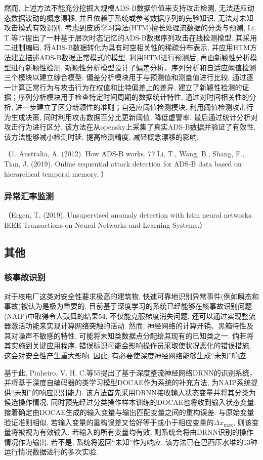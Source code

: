 \documentclass{Style/aas}
\begin{document}
\begin{multicols}{2}
  然而, 上述方法不能充分挖掘大规模ADS-B数据价值来支持攻击检测, 无法适应动态数据波动的概念漂移, 并且依赖于系统或参考数据序列的先验知识, 无法对未知攻击模式有效识别. 考虑到皮质学习算法(HTM)擅长处理流数据的分类与预测, Li, T.等77提出了一种基于层次时态记忆的ADS-B数据序列攻击在线检测模型. 其采用二进制编码, 将ADS-B数据转化为具有时空相关性的稀疏分布表示, 并应用HTM方法建立描述ADS-B数据正常模式的模型. 利用HTM进行预测后, 再由新颖性分析模型进行新颖性检测, 新颖性分析模型设计了偏差分析、序列分析和自适应阈值检测三个模块以建立综合模型: 偏差分析模块用于与预测值和测量值进行比较, 通过逐一计算正常行为与攻击行为在权值和比特偏差上的差异, 建立了新颖性检测的证据；序列分析模块用于检查特定时间周期的数据统计特性, 通过对时间相关性的分析, 进一步建立了区分新颖性的准则；自适应阈值检测模块, 利用阈值检测攻击行为生成决策, 同时利用攻击数据百分比更新阈值, 降低虚警率. 最后通过统计分析对攻击行为进行区分. 该方法在从opensky上采集了真实ADS-B数据并验证了有效性, 该方法能够减小检测时延, 提高检测精度, 减轻概念漂移的影响.

  （1.	Australia, A. (2012). How ADS-B works.
  77.Li, T., Wang, B., Shang, F., Tian, J. (2019). Online sequential attack detection for ADS-B data based on hierarchical temporal memory. ）
  
  \subsubsection{异常汇率监测}
  （Ergen, T. (2019). Unsupervised anomaly detection with lstm neural networks. IEEE Transactions on Neural Networks and Learning Systems.）

  \subsection{其他}

  \subsubsection{核事故识别} 
  对于核电厂这类对安全性要求极高的建筑物, 快速可靠地识别异常事件(例如瞬态和事故)被认为是极为重要的. 目前基于深度学习的系统已经能够在核事故识别问题(NAIP)中取得令人鼓舞的结果54, 不仅能克服梯度消失问题, 还可以通过实现整流器激活功能来实现计算网络突触的活动. 然而, 神经网络的计算开销、黑箱特性及其对噪声不敏感的特性, 可能将未知类数据点分配给其现有的已知类之一. 倘若将其实施到关键应用程序, 错误标识可能会影响操作员采取使状况恶化的错误措施, 这会对安全性产生重大影响. 因此, 有必要使深度神经网络能够生成“未知”响应. 

基于此, Pinheiro, V. H. C.等55提出了基于深度整流神经网络DRNN的识别系统，并将基于深度自编码器的类学习模型DOCAE作为系统的补充方法, 为NAIP系统提供“未知”的响应识别能力. 该方法首先采用DRNN接收输入状态变量并将其分类为候选操作情况, 同时预先经过分类操作样本训练的DOCAE也将收到输入状态变量. 接着确定由DOCAE生成的输入变量与输出匹配变量之间的重构误差. 与原始变量验证准则相似, 若输入变量的重构误差又恰好等于或小于相应变量的$ \varDelta x_{\max} $, 则该变量将被视为有效输入. 若输入的所有变量均有效, 则系统会将由DRNN识别的操作情况作为输出. 若不是, 系统将返回“未知”作为响应. 该方法已在巴西压水堆的13种运行情况数据进行的多次实验. 


\end{multicols}
\end{document}
